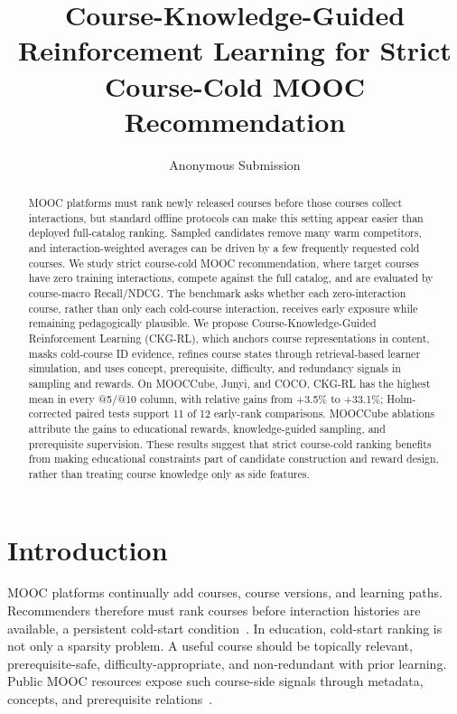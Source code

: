 \documentclass[letterpaper]{article}
\begin{document}
\title{Course-Knowledge-Guided Reinforcement Learning for Strict Course-Cold MOOC Recommendation}
\author{Anonymous Submission}
\affiliations{}

\maketitle

\begin{abstract}
MOOC platforms must rank newly released courses before those courses collect interactions, but standard offline protocols can make this setting appear easier than deployed full-catalog ranking. Sampled candidates remove many warm competitors, and interaction-weighted averages can be driven by a few frequently requested cold courses. We study strict course-cold MOOC recommendation, where target courses have zero training interactions, compete against the full catalog, and are evaluated by course-macro Recall/NDCG. The benchmark asks whether each zero-interaction course, rather than only each cold-course interaction, receives early exposure while remaining pedagogically plausible. We propose Course-Knowledge-Guided Reinforcement Learning (CKG-RL), which anchors course representations in content, masks cold-course ID evidence, refines course states through retrieval-based learner simulation, and uses concept, prerequisite, difficulty, and redundancy signals in sampling and rewards. On MOOCCube, Junyi, and COCO, CKG-RL has the highest mean in every @5/@10 column, with relative gains from +3.5\% to +33.1\%; Holm-corrected paired tests support 11 of 12 early-rank comparisons. MOOCCube ablations attribute the gains to educational rewards, knowledge-guided sampling, and prerequisite supervision. These results suggest that strict course-cold ranking benefits from making educational constraints part of candidate construction and reward design, rather than treating course knowledge only as side features.
\end{abstract}

\section{Introduction}
MOOC platforms continually add courses, course versions, and learning paths. Recommenders therefore must rank courses before interaction histories are available, a persistent cold-start condition~\cite{schein2002coldstart,gantner2010attribute,lin2024tdro,zhang2025coldstartllm}. In education, cold-start ranking is not only a sparsity problem. A useful course should be topically relevant, prerequisite-safe, difficulty-appropriate, and non-redundant with prior learning. Public MOOC resources expose such course-side signals through metadata, concepts, and prerequisite relations~\cite{yu2020mooccube,wang2021mooccubex}.
\end{document}
